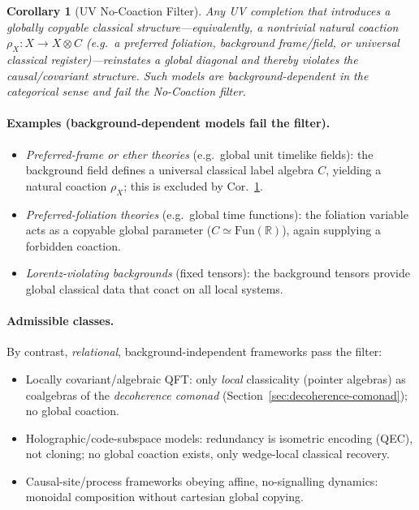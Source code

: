 \documentclass[11pt]{article}
\theoremstyle{upright}
\newtheorem{corollary}{Corollary}
\begin{document}
\begin{corollary}[UV No-Coaction Filter]
\label{cor:uv-filter}
Any UV completion that introduces a \emph{globally copyable} classical structure---equivalently, a nontrivial natural coaction $\rho_X:X\!\to\!X\!\otimes\!C$ (e.g.\ a preferred foliation, background frame/field, or universal classical register)---reinstates a global diagonal and thereby violates the causal/covariant structure. Such models are \emph{background-dependent} in the categorical sense and fail the No-Coaction filter.
\end{corollary}

\paragraph{Examples (background-dependent models fail the filter).}
\begin{itemize}
\item \emph{Preferred-frame or ether theories} (e.g.\ global unit timelike fields): the background field defines a universal classical label algebra $C$, yielding a natural coaction $\rho_X$; this is excluded by Cor.~\ref{cor:uv-filter}.
\item \emph{Preferred-foliation theories} (e.g.\ global time functions): the foliation variable acts as a copyable global parameter ($C\simeq \mathrm{Fun}(\mathbb{R})$), again supplying a forbidden coaction.
\item \emph{Lorentz-violating backgrounds} (fixed tensors): the background tensors provide global classical data that coact on all local systems.
\end{itemize}

\paragraph{Admissible classes.}
By contrast, \emph{relational}, background-independent frameworks pass the filter:
\begin{itemize}
\item Locally covariant/algebraic QFT: only \emph{local} classicality (pointer algebras) as coalgebras of the \emph{decoherence comonad} (Section~\ref{sec:decoherence-comonad}); no global coaction.
\item Holographic/code-subspace models: redundancy is isometric encoding (QEC), not cloning; no global coaction exists, only wedge-local classical recovery.
\item Causal-site/process frameworks obeying affine, no-signalling dynamics: monoidal composition without cartesian global copying.
\end{itemize}
\end{document}
